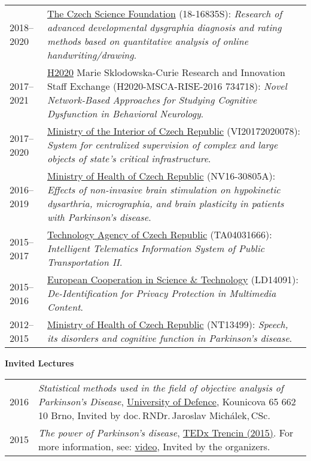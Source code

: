 \noindent
\begin{longtable}{@{}p{2.8cm}p{11.5cm}}
 2018--2020 & \href{https://gacr.cz/en/}{The Czech Science Foundation} (18-16835S): \emph{Research of advanced developmental dysgraphia diagnosis and rating methods based on quantitative analysis of online handwriting/drawing}. \\
 2017--2021 & \href{https://ec.europa.eu/research/participants/portal/desktop/en/opportunities/h2020/topics/msca-rise-2018.html}{H2020} Marie Sklodowska-Curie Research and Innovation Staff Exchange (H2020-MSCA-RISE-2016 734718): \emph{Novel Network-Based Approaches for Studying Cognitive Dysfunction in Behavioral Neurology}. \\
 2017--2020 & \href{http://www.mvcr.cz/}{Ministry of the Interior of Czech Republic} (VI20172020078): \emph{System for centralized supervision of complex and large objects of state's critical infrastructure}. \\
 2016--2019 & \href{http://www.azvcr.cz/en}{Ministry of Health of Czech Republic} (NV16-30805A): \emph{Effects of non-invasive brain stimulation on hypokinetic dysarthria, micrographia, and brain plasticity in patients with Parkinson's disease}. \\
 2015--2017 & \href{https://www.tacr.cz/index.php/en/}{Technology Agency of Czech Republic} (TA04031666): \emph{Intelligent Telematics Information System of Public Transportation II}. \\
 2015--2016 & \href{http://www.cost.eu/}{European Cooperation in Science \& Technology} (LD14091): \emph{De-Identification for Privacy Protection in Multimedia Content}. \\
 2012--2015 & \href{http://www.azvcr.cz/en}{Ministry of Health of Czech Republic} (NT13499): \emph{Speech, its disorders and cognitive function in Parkinson's disease}.
\end{longtable}

\vspace{1em}

\noindent
\textbf{Invited Lectures}

\vspace{1em}

\begin{longtable}{@{}p{2.8cm}p{11.5cm}}
 2016 & \emph{Statistical methods used in the field of objective analysis of Parkinson's Disease},  \href{http://www.unob.cz/}{University of Defence}, Kounicova 65 662 10 Brno, Invited by doc.\,RNDr.\,Jaroslav Mich\'{a}lek,\,CSc. \\
 2015 & \emph{The power of Parkinson's disease}, \href{https://www.ted.com/tedx/events/15505}{TEDx Trencin (2015)}. For more information, see: \href{https://www.youtube.com/watch?v=_4Jo8mmdhxw}{video}, Invited by the organizers.
\end{longtable}

